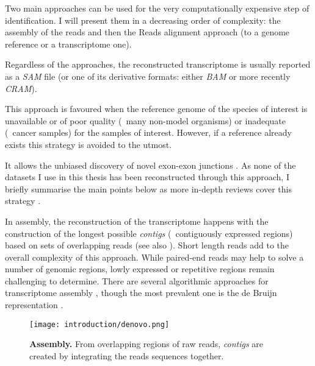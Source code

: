 Two main approaches can be used for the very computationally expensive step of
identification. I will present them in a decreasing order of complexity:
the  assembly of the reads and then the Reads alignment approach
(to a genome reference or a transcriptome one).

Regardless of the approaches, the reconstructed transcriptome is usually reported
as a \emph{\gls{SAM}} file  (or one of its derivative formats:
either \emph{\gls{BAM}} or more recently \emph{CRAM}).

\begin{comment}
\begin{figure}
    \texttt{[image: introduction/MappingStrategies3.pdf]}\centering
    \caption[Overview of main reconstruction strategies for
    \Rnaseq\ transcriptome]{\label{fig:OverviewRnaseqMapping}\textbf{Overview of main
    reconstruction strategies for an \Rnaseq\ transcriptome}}
\end{figure}
\end{comment}

This approach is favoured when the reference genome of the species of interest
is unavailable or of poor quality
(\eg\ many non-model organisms) or inadequate (\eg\ cancer samples)
for the samples of interest. However, if a reference already exists this strategy
is avoided to the utmost.

It allows the unbiased discovery of novel
exon-exon junctions . As none of the datasets I use in this
thesis has been reconstructed through this approach, I briefly summarise
the main points below as more in-depth reviews cover this strategy
.

In  assembly, the reconstruction of the transcriptome happens
with the construction of the longest possible \emph{contigs} (\ie\ contiguously
expressed regions) based on sets of overlapping reads (see also
). Short length reads add
to the overall complexity of this approach. While paired-end reads may help to
solve a number of genomic regions, lowly expressed or repetitive regions remain
challenging to determine. There are several algorithmic approaches for  transcriptome assembly ,
though the most prevalent one is the de Bruijn representation .

\begin{figure}
    \texttt{[image: introduction/denovo.png]}\centering
    \caption[\textit{de novo} Assembly]{\label{fig:denovo}\textbf{
    Assembly.} From overlapping regions of raw reads, \emph{contigs} are
    created by integrating the reads sequences together.}
\end{figure}

